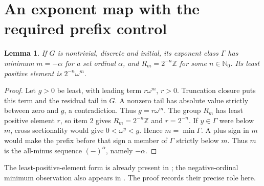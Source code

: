\documentclass[11pt]{article}
\newcommand{\Z}{\mathbb{Z}}
\newtheorem{lemma}[theorem]{Lemma}
\begin{document}
\section{An exponent map with the required prefix control}
\begin{lemma}\label{bottom}
If $G$ is nontrivial, discrete and initial, its exponent class $\Gamma$
has minimum $m=-\alpha$ for a set ordinal $\alpha$, and
$R_m=2^{-n}\Z$ for some $n\in\mathbb{N}_0$.
Its least positive element is $2^{-n}\omega^m$.
\end{lemma}
\begin{proof}
Let $g>0$ be least, with leading term $r\omega^m$, $r>0$.
Truncation closure puts this term and the residual tail in $G$.
A nonzero tail has absolute value strictly between zero and $g$,
a contradiction. Thus $g=r\omega^m$.
The group $R_m$ has least positive element $r$, so item 2 gives
$R_m=2^{-n}\Z$ and $r=2^{-n}$.
If $y\in\Gamma$ were below $m$, cross sectionality would give
$0<\omega^y<g$. Hence $m=\min\Gamma$.
A plus sign in $m$ would make the prefix before that sign a member of
$\Gamma$ strictly below $m$. Thus $m$ is the all-minus sequence
$(-)^\alpha$, namely $-\alpha$.
\end{proof}
The least-positive-element form is already present in
\cite[Proposition 5.2]{ek}; the negative-ordinal minimum observation
also appears in \cite[Lemma 3.2]{adh}. The proof records their
precise role here.
\end{document}
